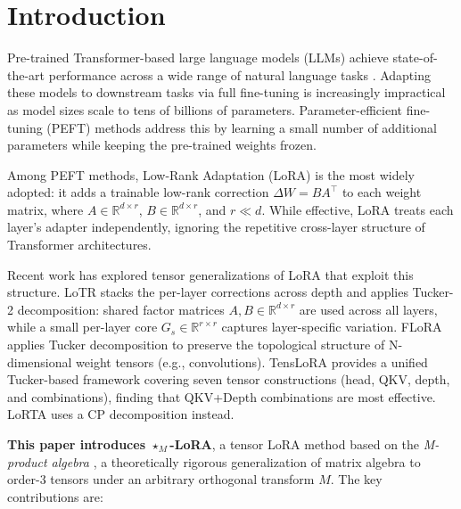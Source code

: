 \documentclass{article}
\newcommand{\R}{\mathbb{R}}
\newcommand{\transpose}{^{\!\top}}
\theoremstyle{plain}
\begin{document}
\section{Introduction}
\label{sec:intro}

Pre-trained Transformer-based large language models (LLMs) achieve state-of-the-art
performance across a wide range of natural language tasks
\citep{devlin2019bert,liu2019roberta,vaswani2017attention}.
Adapting these models to downstream tasks via full fine-tuning is increasingly
impractical as model sizes scale to tens of billions of parameters.
Parameter-efficient fine-tuning (PEFT) methods address this by learning a small
number of additional parameters while keeping the pre-trained weights frozen.

Among PEFT methods, Low-Rank Adaptation (LoRA) \citep{hu2022lora} is the most
widely adopted: it adds a trainable low-rank correction $\Delta W = BA\transpose$
to each weight matrix, where $A \in \R^{d \times r}$, $B \in \R^{d \times r}$,
and $r \ll d$.
While effective, LoRA treats each layer's adapter independently, ignoring the
repetitive cross-layer structure of Transformer architectures.

Recent work has explored tensor generalizations of LoRA that exploit this structure.
LoTR \citep{bershatsky2024lotr} stacks the per-layer corrections across depth
and applies Tucker-2 decomposition: shared factor matrices $A, B \in \R^{d \times r}$
are used across all layers, while a small per-layer core $G_s \in \R^{r \times r}$
captures layer-specific variation.
FLoRA \citep{si2024flora} applies Tucker decomposition to preserve the topological
structure of N-dimensional weight tensors (e.g., convolutions).
TensLoRA \citep{marmoret2025tenslora} provides a unified Tucker-based framework
covering seven tensor constructions (head, QKV, depth, and combinations),
finding that QKV+Depth combinations are most effective.
LoRTA \citep{hounie2024lorta} uses a CP decomposition instead.

\textbf{This paper introduces $\star_M$-LoRA}, a tensor LoRA method based on the
\emph{M-product algebra} \citep{kilmer2011factorization,kernfeld2015tensor},
a theoretically rigorous generalization of matrix algebra to order-3 tensors
under an arbitrary orthogonal transform $M$.
The key contributions are:
\end{document}
